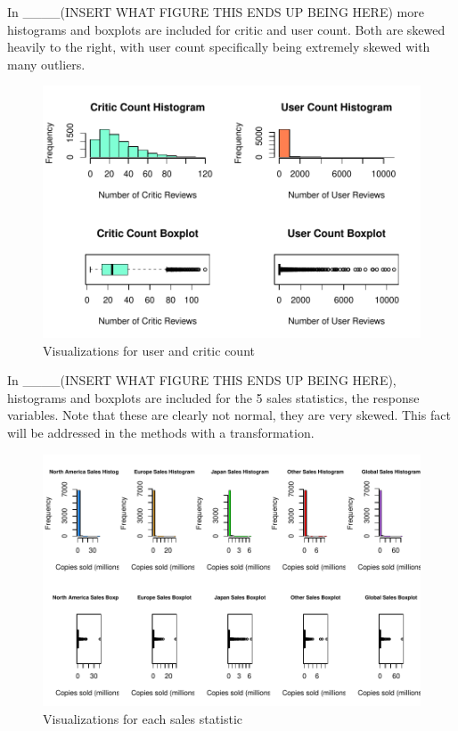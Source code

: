 \documentclass[12pt]{article}
\begin{document}
In ____(INSERT WHAT FIGURE THIS ENDS UP BEING HERE) more histograms and boxplots are included for critic and user count.
Both are skewed heavily to the right, with user count specifically being extremely skewed with many outliers.
\begin{figure}[tbp]
  \centering
  \includegraphics[width=\textwidth]{histandboxpt2.pdf}
  \caption{Visualizations for user and critic count}
  \label{fig:histandboxpt2}
\end{figure}


In ____(INSERT WHAT FIGURE THIS ENDS UP BEING HERE), histograms and boxplots are included for the 5 sales statistics, the response variables.
Note that these are clearly not normal, they are very skewed. This fact will be addressed in the methods with a transformation.
\begin{figure}[tbp]
  \centering
  \includegraphics[width=\textwidth]{histandboxsales.pdf}
  \caption{Visualizations for each sales statistic}
  \label{fig:histandboxsales}
\end{figure}
\end{document}
